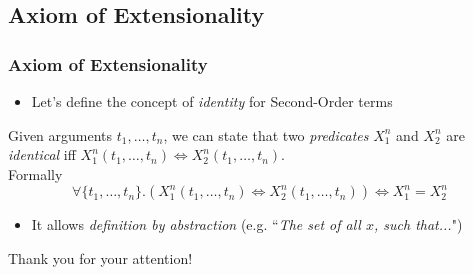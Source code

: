 \documentclass{beamer}
\begin{document}
            \subsection{Axiom of Extensionality}
                \begin{frame}
                    \frametitle{Axiom of Extensionality}
                    \begin{itemize}
                        \item Let's define the concept of \textit{identity} for Second-Order terms
                    \end{itemize}
                    \begin{definition}
                        Given arguments $ t_1, \dots, t_n $, we can state that two \textit{predicates} $ X_1^n $ and $ X_2^n $ are \textit{identical} iff $ X_1^n(t_1, \dots, t_n) \Leftrightarrow X_2^n(t_1, \dots, t_n) $.\\
                        Formally
                        \[
                            \forall \{ t_1, \dots, t_n \}. (X_1^n(t_1, \dots, t_n) \Leftrightarrow X_2^n(t_1, \dots, t_n)) \Leftrightarrow X_1^n = X_2^n
                        \]
                    \end{definition}
                    \begin{itemize}
                        \item It allows \textit{definition by abstraction} (e.g. ``\textit{The set of all $ x $, such that...}")
                    \end{itemize}
                \end{frame}

                \begin{frame}
                    \vspace*{1cm}
                    \begin{center}
                        \begin{Huge}
                            \textcolor{title_blue}{Thank you for your attention!}
                        \end{Huge}
                    \end{center}
                \end{frame}
\end{document}
